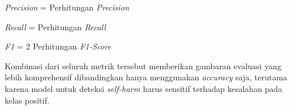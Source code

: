 \begin{equationcaptioned}[eq:precision]{
\textit{Precision} = 
}{
Perhitungan \textit{Precision}
}
\end{equationcaptioned}

\begin{equationcaptioned}[eq:recall]{
\textit{Recall} = 
}{
Perhitungan \textit{Recall}
}
\end{equationcaptioned}

\begin{equationcaptioned}[eq:f1-score]{
\textit{F1} = 
2 \times 
{}
}{
Perhitungan \textit{F1-Score}
}
\end{equationcaptioned}

Kombinasi dari seluruh metrik tersebut memberikan gambaran evaluasi yang lebih komprehensif dibandingkan hanya menggunakan \textit{accuracy} saja, terutama karena model untuk deteksi \textit{self-harm} harus sensitif terhadap kesalahan pada kelas positif. 

